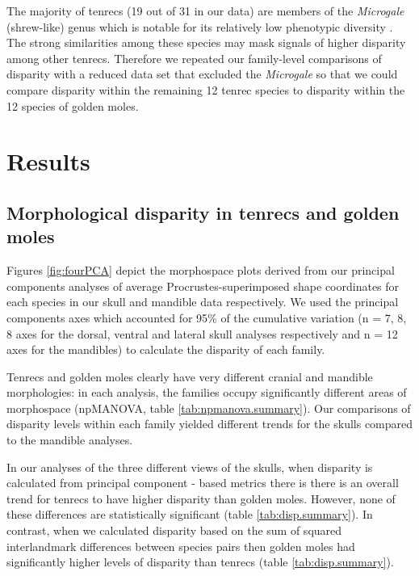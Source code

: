 \documentclass[12pt,a4paper]{article}
\begin{document}
	The majority of tenrecs (19 out of 31 in our data) are members of the \textit{Microgale} (shrew-like) genus which is notable for its relatively low phenotypic diversity \citep{ Soarimalala2011, Jenkins2003}. The strong similarities among these species may mask signals of higher disparity among other tenrecs. Therefore we repeated our family-level comparisons of disparity with a reduced data set that excluded the \textit{Microgale} so that we could compare disparity within the remaining 12 tenrec species to disparity within the 12 species of golden moles.



\section{Results}


\subsection{Morphological disparity in tenrecs and golden moles} 
 
	Figures  \ref{fig:fourPCA} depict the morphospace plots derived from our principal components analyses of average Procrustes-superimposed shape coordinates for each species in our skull and mandible data respectively. We used the principal components axes which accounted for 95\% of the cumulative variation (n = 7, 8, 8 axes for the dorsal, ventral and lateral skull analyses respectively and n = 12 axes for the mandibles) to calculate the disparity of each family. 

	Tenrecs and golden moles clearly have very different cranial and mandible morphologies: in each analysis, the families occupy significantly different areas of morphospace (npMANOVA, table \ref{tab:npmanova.summary}). 
	Our comparisons of disparity levels within each family yielded different trends for the skulls compared to the mandible analyses.
	
	In our analyses of the three different views of the skulls, when disparity is calculated from principal component - based metrics there is there is an overall trend for tenrecs to have higher disparity than golden moles. However, none of these differences are statistically significant (table \ref{tab:disp.summary}). In contrast, when we calculated disparity based on the sum of squared interlandmark differences between species pairs \citep{Zelditch2012} then golden moles had significantly higher levels of disparity than tenrecs (table \ref{tab:disp.summary}).
	
\end{document}
